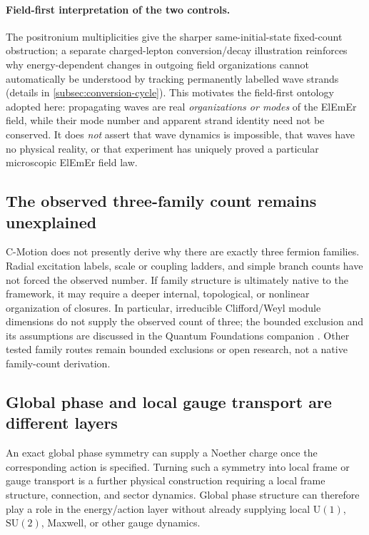\documentclass[11pt]{article}
\theoremstyle{definition}
\newcommand{\cmotion}{\mbox{C-Motion}}
\begin{document}
\paragraph{Field-first interpretation of the two controls.}
The positronium multiplicities give the sharper same-initial-state fixed-count
obstruction; a separate charged-lepton conversion/decay illustration reinforces why
energy-dependent changes in outgoing field organizations cannot automatically be understood
by tracking permanently labelled wave strands (details in
\cref{subsec:conversion-cycle}).  This motivates the field-first
ontology adopted here: propagating waves are real \emph{organizations or modes}
of the ElEmEr field, while their mode number and apparent strand identity need
not be conserved.  It does \emph{not} assert that wave dynamics is impossible,
that waves have no physical reality, or that experiment has uniquely proved a
particular microscopic ElEmEr field law.

\subsection{The observed three-family count remains unexplained}
\label{subsec:family_concession}

\cmotion{} does not presently derive why there are exactly three fermion families.
Radial excitation labels, scale or coupling ladders, and simple branch counts have not
forced the observed number.  If family structure is ultimately native to the framework,
it may require a deeper internal, topological, or nonlinear organization of
closures.  In particular, irreducible Clifford/Weyl module dimensions do not
supply the observed count of three; the bounded exclusion and its assumptions
are discussed in the Quantum Foundations companion
\cite{CmotionQuantumFoundations2026}.  Other tested family routes remain
bounded exclusions or open research, not a native family-count derivation.

\subsection{Global phase and local gauge transport are different layers}
\label{subsec:phase_gauge}

An exact global phase symmetry can supply a Noether charge once the corresponding action
is specified.  Turning such a symmetry into local frame or gauge transport is a further
physical construction requiring a local frame structure, connection, and sector
dynamics.  Global phase structure can therefore play a role in the energy/action layer
without already supplying local $\mathrm U(1)$, $\mathrm{SU}(2)$, Maxwell, or other gauge
dynamics.
\end{document}
